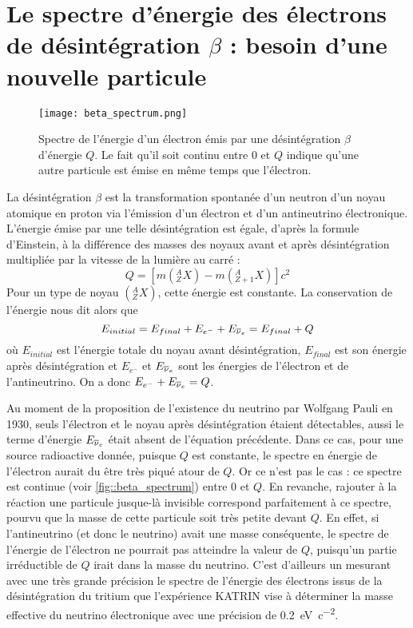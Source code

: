     \section[Le spectre d'énergie des électrons de désintégration \texorpdfstring{$\beta$}{b}]{Le spectre d'énergie des électrons de désintégration \texorpdfstring{$\beta$}{b} : besoin d'une nouvelle particule}\label{sec::neutrino_origin}

      \begin{figure}[htpb]
        \centering
        \texttt{[image: beta\_spectrum.png]}
        \caption[Spectre de désintégration $\beta$]{\label{fig::beta_spectrum}Spectre de l'énergie d'un électron émis par une désintégration $\beta$ d'énergie $Q$. Le fait qu'il soit continu entre 0 et $Q$ indique qu'une autre particule est émise en même temps que l'électron.}
      \end{figure}
      La désintégration $\beta$ est la transformation spontanée d'un neutron d'un noyau atomique en proton via l'émission d'un électron et d'un antineutrino électronique. L'énergie émise par une telle désintégration est égale, d'après la formule d'Einstein, à la différence des masses des noyaux avant et après désintégration multipliée par la vitesse de la lumière au carré : 
      \begin{equation}
	    Q = \left[m\left(^A_Z X\right)-m\left(^A_{Z+1} X\right)\right]c^2
      \end{equation}
      Pour un type de noyau $\left(^A_Z X\right)$, cette énergie est constante. La conservation de l'énergie nous dit alors que
      \begin{equation}
	    E_{initial} = E_{final} +E_{e^-}+E_{\overline{\nu}_e} = E_{final}+Q
      \end{equation}
      où $E_{initial}$ est l'énergie totale du noyau avant désintégration, $E_{final}$ est son énergie après désintégration et $E_{e^-}$ et $E_{\overline{\nu}_e}$ sont les énergies de l'électron et de l'antineutrino. On a donc $E_{e^-}+E_{\overline{\nu}_e} = Q$.

      Au moment de la proposition de l'existence du neutrino par Wolfgang Pauli en 1930\cite{Pauli1930}, seuls l'électron et le noyau après désintégration étaient détectables, aussi le terme d'énergie $E_{\overline{\nu}_e}$ était absent de l'équation précédente. Dans ce cas, pour une source radioactive donnée, puisque $Q$ est constante, le spectre en énergie de l'électron aurait du être très piqué atour de $Q$. Or ce n'est pas le cas : ce spectre est continue (voir \autoref{fig::beta_spectrum}) entre 0 et $Q$. En revanche, rajouter à la réaction une particule jusque-là invisible correspond parfaitement à ce spectre, pourvu que la masse de cette particule soit très petite devant $Q$. En effet, si l'antineutrino (et donc le neutrino) avait une masse conséquente, le spectre de l'énergie de l'électron ne pourrait pas atteindre la valeur de $Q$, puisqu'un partie irréductible de $Q$ irait dans la masse du neutrino. C'est d'ailleurs un mesurant avec une très grande précision le spectre de l'énergie des électrons issus de la désintégration du tritium que l'expérience KATRIN\cite{Kleesiek2018} vise à déterminer la masse effective du neutrino électronique avec une précision de \SI{0.2}{\electronvolt\per c\squared}.

